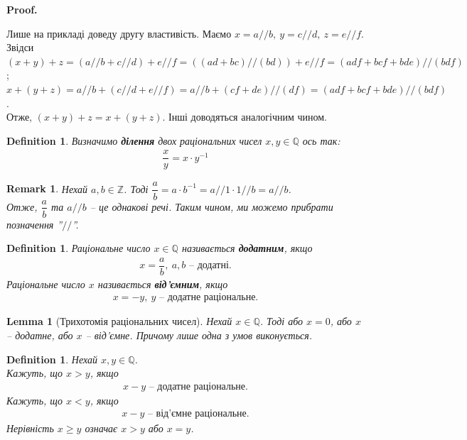 \documentclass[a4paper, 14pt]{extarticle}
\makeatletter
\theoremstyle{theoremdd}
\theoremstyle{theoremdd}
\newtheorem{definition}[theorem]{Definition}
\theoremstyle{theoremdd}
\theoremstyle{theoremdd}
\theoremstyle{theoremdd}
\theoremstyle{theoremdd}
\theoremstyle{theoremdd}
\theoremstyle{theoremdd}
\theoremstyle{theoremdd}
\theoremstyle{theoremdd}
\theoremstyle{theoremdd}
\theoremstyle{theoremdd}
\newtheorem{remark}[theorem]{Remark}
\theoremstyle{theoremdd}
\theoremstyle{theoremdd}
\newtheorem{lemma}[theorem]{Lemma}
\theoremstyle{theoremdd}
\theoremstyle{theoremdd}
\renewenvironment{proof}[1][Proof.\\]{\par
\pushQED{\hfill \qed}%
\normalfont \topsep6\p@\@plus6\p@\relax
\trivlist
\item\relax
{\bfseries
#1\@addpunct{.}}\hspace\labelsep\ignorespaces
}{%
\popQED\endtrivlist\@endpefalse
}
\makeatother
\begin{document}
\begin{proof}
Лише на прикладі доведу другу властивість. Маємо $x = a//b,\ y = c//d,\ z = e//f$. Звідси\\
$(x+y)+z = (a//b + c//d) + e//f = ((ad+bc)//(bd)) + e//f = (adf+bcf+bde)//(bdf)$;\\
$x+(y+z) = a//b + (c//d + e//f) = a//b + (cf+de)//(df) = (adf + bcf + bde)//(bdf)$.\\
Отже, $(x+y)+z=x+(y+z)$. Інші доводяться аналогічним чином.
\end{proof}

\begin{definition}
Визначимо \textbf{ділення} двох раціональних чисел $x,y \in \mathbb{Q}$ ось так:
\begin{align*}
\dfrac{x}{y} = x \cdot y^{-1}
\end{align*}
\end{definition}

\begin{remark}
Нехай $a,b \in \mathbb{Z}$. Тоді
$\dfrac{a}{b} = a \cdot b^{-1} = a//1 \cdot 1//b = a//b$.\\
Отже, $\dfrac{a}{b}$ та $a//b$ -- це однакові речі. Таким чином, ми можемо прибрати позначення ''$//$''.
\end{remark}

\begin{definition}
Раціональне число $x \in \mathbb{Q}$ називається \textbf{додатним}, якщо
\begin{align*}
x = \dfrac{a}{b},\ a,b \text{ -- додатні}.
\end{align*}
Раціональне число $x$ називається \textbf{від'ємним}, якщо
\begin{align*}
x =  -y,\ y \text{ -- додатне раціональне}.
\end{align*}  
\end{definition}

\begin{lemma}[Трихотомія раціональних чисел]
Нехай $x \in \mathbb{Q}$. Тоді або $x = 0$, або $x$ -- додатне, або $x$ -- від'ємне. Причому лише одна з умов виконується. 
\end{lemma}

\begin{definition}
Нехай $x,y \in \mathbb{Q}$.\\
Кажуть, що $x > y$, якщо
\begin{align*}
x-y \text{ -- додатне раціональне}.
\end{align*}
Кажуть, що $x < y$, якщо
\begin{align*}
x-y \text{ -- від'ємне раціональне}.
\end{align*}
Нерівність $x \geq y$ означає $x>y$ або $x=y$.
\end{definition}
\end{document}
